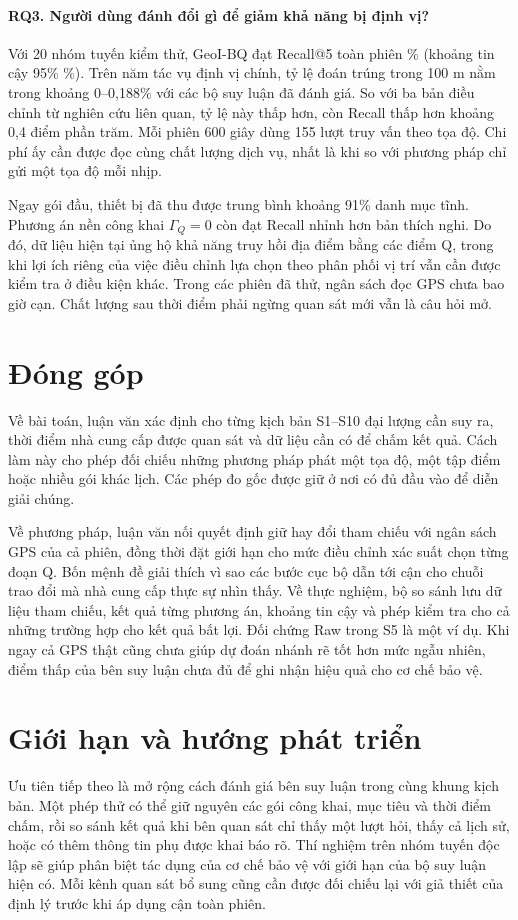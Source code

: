 \paragraph{RQ3. Người dùng đánh đổi gì để giảm khả năng bị định vị?}
Với 20 nhóm tuyến kiểm thử, GeoI-BQ đạt Recall@5 toàn phiên \PrimaryRecall\%
(khoảng tin cậy 95\% \PrimaryCI\%). Trên năm tác vụ định vị chính, tỷ lệ đoán trúng trong
100 m nằm trong khoảng 0--0,188\% với các bộ suy luận đã đánh giá. So với ba bản điều chỉnh
từ nghiên cứu liên quan, tỷ lệ này thấp hơn, còn Recall thấp hơn khoảng 0,4 điểm phần trăm.
Mỗi phiên 600 giây dùng 155 lượt truy vấn theo tọa độ. Chi phí ấy cần được đọc cùng chất lượng
dịch vụ, nhất là khi so với phương pháp chỉ gửi một tọa độ mỗi nhịp.

Ngay gói đầu, thiết bị đã thu được trung bình khoảng 91\% danh mục tĩnh. Phương án nền công khai
$\Gamma_Q=0$ còn đạt Recall nhỉnh hơn bản thích nghi. Do đó, dữ liệu hiện tại ủng hộ khả năng
truy hồi địa điểm bằng các điểm Q, trong khi lợi ích riêng của việc điều chỉnh lựa chọn theo
phân phối vị trí vẫn cần được kiểm tra ở điều kiện khác. Trong các phiên đã thử, ngân sách đọc
GPS chưa bao giờ cạn. Chất lượng sau thời điểm phải ngừng quan sát mới vẫn là câu hỏi mở.

\section{Đóng góp}
Về bài toán, luận văn xác định cho từng kịch bản S1--S10 đại lượng cần suy ra, thời điểm nhà cung
cấp được quan sát và dữ liệu cần có để chấm kết quả. Cách làm này cho phép đối chiếu những phương
pháp phát một tọa độ, một tập điểm hoặc nhiều gói khác lịch. Các phép đo gốc được giữ ở nơi có đủ
đầu vào để diễn giải chúng.

Về phương pháp, luận văn nối quyết định giữ hay đổi tham chiếu với ngân sách GPS của cả phiên,
đồng thời đặt giới hạn cho mức điều chỉnh xác suất chọn từng đoạn Q. Bốn mệnh đề giải thích vì sao
các bước cục bộ dẫn tới cận cho chuỗi trao đổi mà nhà cung cấp thực sự nhìn thấy. Về thực nghiệm,
bộ so sánh lưu dữ liệu tham chiếu, kết quả từng phương án, khoảng tin cậy và phép kiểm tra cho
cả những trường hợp cho kết quả bất lợi. Đối chứng Raw trong S5 là một ví dụ. Khi ngay cả GPS
thật cũng chưa giúp dự đoán nhánh rẽ tốt hơn mức ngẫu nhiên, điểm thấp của bên suy luận chưa đủ
để ghi nhận hiệu quả cho cơ chế bảo vệ.

\section{Giới hạn và hướng phát triển}
Ưu tiên tiếp theo là mở rộng cách đánh giá bên suy luận trong cùng khung kịch bản. Một phép
thử có thể giữ nguyên các gói công khai, mục tiêu và thời điểm chấm, rồi so sánh kết quả khi
bên quan sát chỉ thấy một lượt hỏi, thấy cả lịch sử, hoặc có thêm thông tin phụ được khai
báo rõ. Thí nghiệm trên nhóm tuyến độc lập sẽ giúp phân biệt tác dụng của cơ chế bảo vệ với
giới hạn của bộ suy luận hiện có. Mỗi kênh quan sát bổ sung cũng cần được đối chiếu lại với
giả thiết của định lý trước khi áp dụng cận toàn phiên.

